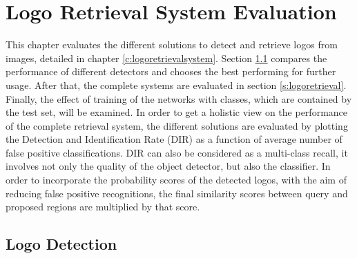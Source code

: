 \chapter{Logo Retrieval System Evaluation}\label{c:evaluation}

This chapter evaluates the different solutions to detect and retrieve logos from images, detailed in chapter \ref{c:logoretrievalsystem}. Section \ref{s:explogodetection} compares the performance of different detectors and chooses the best performing for further usage. After that, the complete systems are evaluated in section \ref{s:logoretrieval}. Finally, the effect of training of the networks with classes, which are contained by the test set, will be examined.
\bigbreak
In order to get a holistic view on the performance of the complete retrieval system, the different solutions are evaluated by plotting the Detection and Identification Rate (DIR) as a function of average number of false positive classifications. DIR can also be considered as a multi-class recall, it involves not only the quality of the object detector, but also the classifier. In order to incorporate the probability scores of the detected logos, with the aim of reducing false positive recognitions, the final similarity scores between query and proposed regions are multiplied by that score.
\bigbreak
\section{Logo Detection}\label{s:explogodetection}

